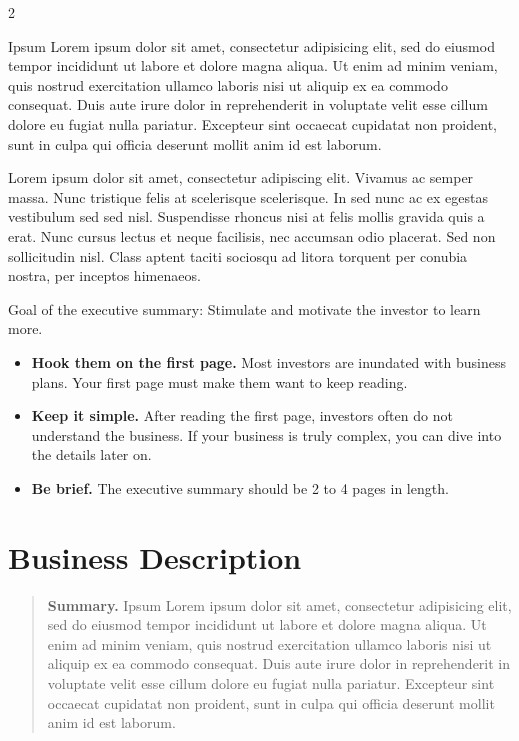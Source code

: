 \documentclass[9pt,]{book}
\providecommand{\tightlist}{%
  \setlength{\itemsep}{0pt}\setlength{\parskip}{0pt}}
\begin{document}
\begin {multicols}{2}

Ipsum Lorem ipsum dolor sit amet, consectetur adipisicing elit, sed do
eiusmod tempor incididunt ut labore et dolore magna aliqua. Ut enim ad
minim veniam, quis nostrud exercitation ullamco laboris nisi ut aliquip
ex ea commodo consequat. Duis aute irure dolor in reprehenderit in
voluptate velit esse cillum dolore eu fugiat nulla pariatur. Excepteur
sint occaecat cupidatat non proident, sunt in culpa qui officia deserunt
mollit anim id est laborum.

Lorem ipsum dolor sit amet, consectetur adipiscing elit. Vivamus ac
semper massa. Nunc tristique felis at scelerisque scelerisque. In sed
nunc ac ex egestas vestibulum sed sed nisl. Suspendisse rhoncus nisi at
felis mollis gravida quis a erat. Nunc cursus lectus et neque facilisis,
nec accumsan odio placerat. Sed non sollicitudin nisl. Class aptent
taciti sociosqu ad litora torquent per conubia nostra, per inceptos
himenaeos.

Goal of the executive summary: Stimulate and motivate the investor to
learn more.

\begin{itemize}
\tightlist
\item
  \textbf{Hook them on the first page.} Most investors are inundated
  with business plans. Your first page must make them want to keep
  reading.
\item
  \textbf{Keep it simple.} After reading the first page, investors often
  do not understand the business. If your business is truly complex, you
  can dive into the details later on.
\item
  \textbf{Be brief.} The executive summary should be 2 to 4 pages in
  length.
\end{itemize}

\lipsum

\end {multicols}

\hypertarget{business-description}{%
\chapter{Business Description}\label{business-description}}

\begin{quote}
\textbf{Summary.} Ipsum Lorem ipsum dolor sit amet, consectetur
adipisicing elit, sed do eiusmod tempor incididunt ut labore et dolore
magna aliqua. Ut enim ad minim veniam, quis nostrud exercitation ullamco
laboris nisi ut aliquip ex ea commodo consequat. Duis aute irure dolor
in reprehenderit in voluptate velit esse cillum dolore eu fugiat nulla
pariatur. Excepteur sint occaecat cupidatat non proident, sunt in culpa
qui officia deserunt mollit anim id est laborum.
\end{quote}
\end{document}
